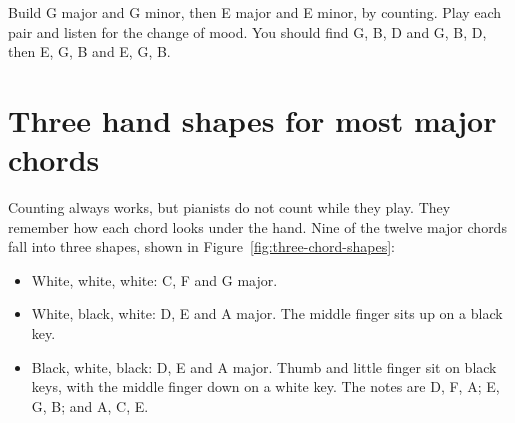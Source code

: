 \begin{tryitbox}
Build G major and G minor, then E major and E minor, by counting. Play each pair and listen for the change of mood. You should find G, B, D and G, B\fl, D,  then E, G\sh, B and E, G, B. 
\end{tryitbox}

\section{Three hand shapes for most major chords}

Counting always works, but pianists do not count while they play. They remember how each chord looks under the hand. Nine of the twelve major chords fall into three shapes, shown in Figure~\ref{fig:three-chord-shapes}:
\begin{itemize}
  \item White, white, white: C, F and G major. 
  \item White, black, white: D, E and A major. The middle finger sits up on a black key. 
  \item Black, white, black: D\fl, E\fl{} and A\fl{} major. Thumb and little finger sit on black keys, with the middle finger down on a white key. The notes are D\fl, F, A\fl; E\fl, G, B\fl; and A\fl, C, E\fl. 
\end{itemize}

